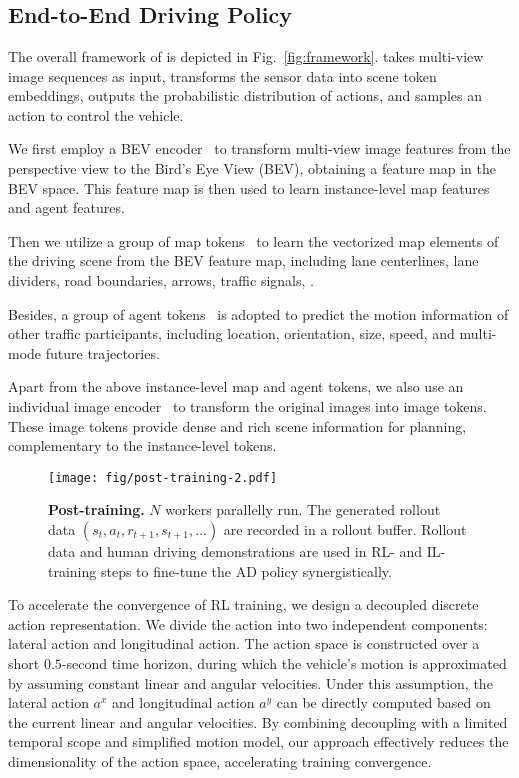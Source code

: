 
\section{\thename}
\subsection{End-to-End Driving Policy}
The overall framework of \thename{} is depicted in Fig.~\ref{fig:framework}. 
\thename{} takes multi-view image sequences as input, transforms the sensor data into scene token embeddings, outputs the probabilistic distribution of actions, and samples an action to control the vehicle. 

We first employ a BEV encoder~\cite{li2022bevformer} to transform multi-view image features from the perspective view to the Bird's Eye View (BEV), obtaining a feature map in the BEV space. This feature map is then used to learn instance-level map features and agent features.

Then we utilize a group of map tokens~\cite{maptrv2, liao2022maptr, lanegap} to learn the vectorized map elements of the driving scene from the BEV feature map, including lane centerlines, lane dividers, road boundaries, arrows, traffic signals, \etc.

Besides, a group of agent tokens~\cite{jiang2022pip} is adopted to predict the motion information of other traffic participants, including location, orientation, size, speed, and multi-mode future trajectories.

Apart from the above instance-level map and agent tokens, we also use an individual image encoder~\cite{vit,he2016resnet} to transform the original images into image tokens. These image tokens provide dense and rich scene information for planning, complementary to the instance-level tokens.

\begin{figure}[t]
\centering
\texttt{[image: fig/post-training-2.pdf]} 
\caption{\textbf{Post-training.}  $N$  workers parallelly run. The generated rollout data $(s_t,a_t, r_{t+1},s_{t+1},...)$ are recorded in a rollout buffer. Rollout data and human driving demonstrations are used in RL- and IL-training steps to fine-tune the AD policy synergistically.
}
\label{fig:post-training}
\end{figure}

To accelerate the convergence of RL training, we design a decoupled discrete action representation. 
We divide the action into two independent components: lateral action and longitudinal action. 
The action space is constructed over a short $0.5$-second time horizon, during which the vehicle's motion is approximated by assuming constant linear and angular velocities. 
Under this assumption, the lateral action $a^x$ and longitudinal action $a^y$ can be directly computed based on the current linear and angular velocities.
By combining decoupling with a limited temporal scope and simplified motion model, our approach effectively reduces the dimensionality of the action space, accelerating training convergence.


